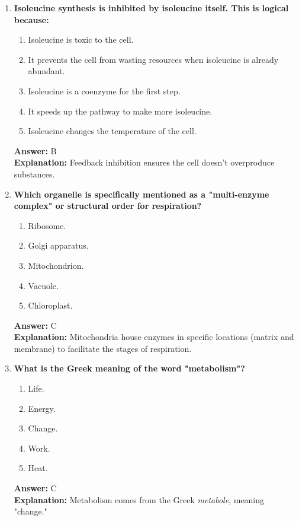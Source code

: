 \documentclass[11pt, a4paper]{article}
\begin{document}
\begin{enumerate}[leftmargin=*, label=\arabic*.]
\item \textbf{Isoleucine synthesis is inhibited by isoleucine itself. This is logical because:}
\begin{enumerate}[label=\Alph*.]
    \item Isoleucine is toxic to the cell.
    \item It prevents the cell from wasting resources when isoleucine is already abundant.
    \item Isoleucine is a coenzyme for the first step.
    \item It speeds up the pathway to make more isoleucine.
    \item Isoleucine changes the temperature of the cell.
\end{enumerate}
\textbf{Answer:} B \\
\textbf{Explanation:} Feedback inhibition ensures the cell doesn't overproduce substances.

\item \textbf{Which organelle is specifically mentioned as a "multi-enzyme complex" or structural order for respiration?}
\begin{enumerate}[label=\Alph*.]
    \item Ribosome.
    \item Golgi apparatus.
    \item Mitochondrion.
    \item Vacuole.
    \item Chloroplast.
\end{enumerate}
\textbf{Answer:} C \\
\textbf{Explanation:} Mitochondria house enzymes in specific locations (matrix and membrane) to facilitate the stages of respiration.

\item \textbf{What is the Greek meaning of the word "metabolism"?}
\begin{enumerate}[label=\Alph*.]
    \item Life.
    \item Energy.
    \item Change.
    \item Work.
    \item Heat.
\end{enumerate}
\textbf{Answer:} C \\
\textbf{Explanation:} Metabolism comes from the Greek \textit{metabole}, meaning "change."


\end{enumerate}
\end{document}

